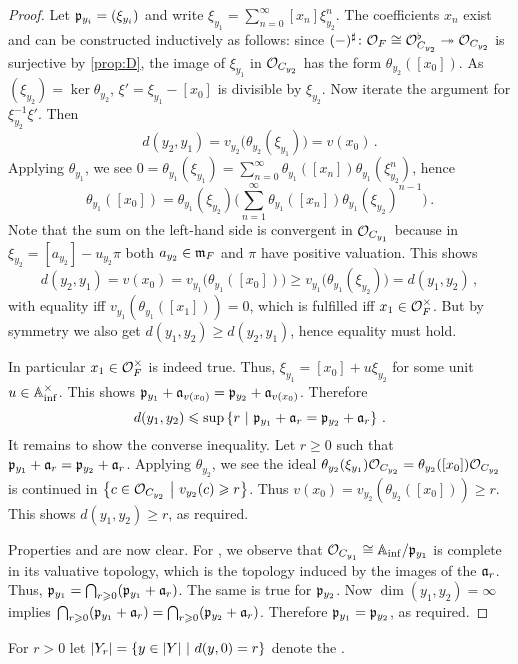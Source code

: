 \begin{proof}
	Let $\pp_{y_i}=(\xi_{y_i})$ and write $\xi_{y_1}=\sum_{n=0}^\infty [x_n]\xi_{y_2}^n$. The coefficients $x_n$ exist and can be constructed inductively as follows: since $(-)^\sharp\colon \Oo_F\cong \Oo_{C_{y_2}}^\flat\epimorphism \Oo_{C_{y_2}}$ is surjective by \cref{prop:D}, the image of $\xi_{y_1}$ in $\Oo_{C_{y_2}}$ has the form $\theta_{y_2}([x_0])$. As $(\xi_{y_2})=\ker\theta_{y_2}$, $\xi'=\xi_{y_1}-[x_0]$ is divisible by $\xi_{y_2}$. Now iterate the argument for $\xi_{y_2}^{-1}\xi'$. Then
	\begin{equation*}
		d(y_2,y_1)=v_{y_2}\big(\theta_{y_2}(\xi_{y_1})\big)=v(x_0)\,.
	\end{equation*}
	Applying $\theta_{y_1}$, we see $0=\theta_{y_1}(\xi_{y_1})=\sum_{n=0}^\infty\theta_{y_1}([x_n])\theta_{y_1}(\xi_{y_2}^n)$, hence
	\begin{equation*}
		\theta_{y_1}([x_0])=\theta_{y_1}(\xi_{y_2})\Bigg(\sum_{n=1}^\infty\theta_{y_1}([x_n])\theta_{y_1}(\xi_{y_2})^{n-1}\Bigg)\,.
	\end{equation*}
	Note that the sum on the left-hand side is convergent in $\Oo_{C_{y_1}}$ because in $\xi_{y_2}=[a_{y_2}]-u_{y_2}\pi$ both $a_{y_2}\in\mm_F$ and $\pi$ have positive valuation. This shows
	\begin{equation*}
		d(y_2,y_1)=v(x_0)=v_{y_1}\big(\theta_{y_1}([x_0])\big)\geq v_{y_1}\big(\theta_{y_1}(\xi_{y_2})\big)=d(y_1,y_2)\,,
	\end{equation*}
	with equality iff $v_{y_1}(\theta_{y_1}([x_1]))=0$, which is fulfilled iff $x_1\in\Oo_F^\times$. But by symmetry we also get $d(y_1,y_2)\geq d(y_2,y_1)$, hence equality must hold.
	
	In particular $x_1\in\Oo_F^\times$ is indeed true. Thus, $\xi_{y_1}=[x_0]+u\xi_{y_2}$ for some unit $u\in \IA_\inf^\times$. This shows $\pp_{y_1}+\aa_{v(x_0)}=\pp_{y_2}+\aa_{v(x_0)}$. Therefore
	\begin{equation*}
		d(y_1,y_2)\leq \sup\left\{r\st \pp_{y_1}+\aa_r=\pp_{y_2}+\aa_r\right\}\,.
	\end{equation*}
	It remains to show the converse inequality. Let $r\geq 0$ such that $\pp_{y_1}+\aa_r=\pp_{y_2}+\aa_r$. Applying $\theta_{y_2}$, we see the ideal $\theta_{y_2}(\xi_{y_1})\Oo_{C_{y_2}}=\theta_{y_2}([x_0])\Oo_{C_{y_2}}$ is continued in $\left\{c\in\Oo_{C_{y_2}}\st v_{y_2}(c)\geq r\right\}$. Thus $v(x_0)=v_{y_2}(\theta_{y_2}([x_0]))\geq r$. This shows $d(y_1,y_2)\geq r$, as required.
	
	Properties  and  are now clear. For , we observe that $\Oo_{C_{y_1}}\cong \IA_\inf/\pp_{y_1}$ is complete in its valuative topology, which is the topology induced by the images of the $\aa_r$. Thus, $\pp_{y_1}=\bigcap_{r\geq 0}(\pp_{y_1}+\aa_r)$. The same is true for $\pp_{y_2}$. Now $\dim(y_1,y_2)=\infty$ implies $\bigcap_{r\geq 0}(\pp_{y_1}+\aa_r)=\bigcap_{r\geq 0}(\pp_{y_2}+\aa_r)$. Therefore $\pp_{y_1}=\pp_{y_2}$, as required.
\end{proof}
\begin{defi}
	For $r>0$ let $|Y_r|=\left\{y\in|Y|\st d(y,0)=r\right\}$ denote the .
\end{defi}

